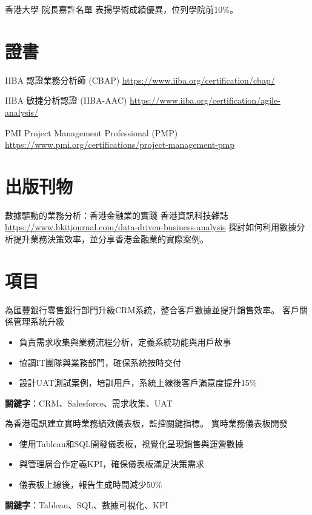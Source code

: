 \documentclass[a4paper, serif, 10pt]{moderncv}
\begin{document}
        {香港大學}
        {院長嘉許名單}
        {}
        {}
        {表揚學術成績優異，位列學院前10\%。}
\section{證書}

        {IIBA}
        {認證業務分析師 (CBAP)}
        {\url{https://www.iiba.org/certification/cbap/}}
        {}
        {}

        {IIBA}
        {敏捷分析認證 (IIBA-AAC)}
        {\url{https://www.iiba.org/certification/agile-analysis/}}
        {}
        {}

        {PMI}
        {Project Management Professional (PMP)}
        {\url{https://www.pmi.org/certifications/project-management-pmp}}
        {}
        {}
\section{出版刊物}

        {數據驅動的業務分析：香港金融業的實踐}
        {香港資訊科技雜誌}
        {\url{https://www.hkitjournal.com/data-driven-business-analysis}}
        {}
        {探討如何利用數據分析提升業務決策效率，並分享香港金融業的實際案例。}
\section{項目}

        {為匯豐銀行零售銀行部門升級CRM系統，整合客戶數據並提升銷售效率。}
        {客戶關係管理系統升級}
        {}
        {}
        {\begin{itemize}
\item 負責需求收集與業務流程分析，定義系統功能與用戶故事
\item 協調IT團隊與業務部門，確保系統按時交付
\item 設計UAT測試案例，培訓用戶，系統上線後客戶滿意度提升15\%
\end{itemize}
\textbf{關鍵字}：CRM、Salesforce、需求收集、UAT}

        {為香港電訊建立實時業務績效儀表板，監控關鍵指標。}
        {實時業務儀表板開發}
        {}
        {}
        {\begin{itemize}
\item 使用Tableau和SQL開發儀表板，視覺化呈現銷售與運營數據
\item 與管理層合作定義KPI，確保儀表板滿足決策需求
\item 儀表板上線後，報告生成時間減少50\%
\end{itemize}
\textbf{關鍵字}：Tableau、SQL、數據可視化、KPI}
\end{document}
